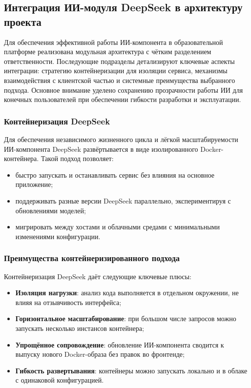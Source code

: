 \subsection{Интеграция ИИ-модуля DeepSeek в архитектуру проекта}

Для обеспечения эффективной работы ИИ-компонента в образовательной платформе реализована модульная архитектура с чётким разделением ответственности. Последующие подразделы детализируют ключевые аспекты интеграции: стратегию контейнеризации для изоляции сервиса, механизмы взаимодействия с клиентской частью и системные преимущества выбранного подхода. Основное внимание уделено сохранению прозрачности работы ИИ для конечных пользователей при обеспечении гибкости разработки и эксплуатации.

\subsubsection{Контейнеризация DeepSeek}
Для обеспечения независимого жизненного цикла и лёгкой масштабируемости ИИ-компонента DeepSeek развёртывается в виде изолированного Docker-контейнера. Такой подход позволяет:

\begin{itemize}
  \item быстро запускать и останавливать сервис без влияния на основное приложение;
  \item поддерживать разные версии DeepSeek параллельно, экспериментируя с обновлениями моделей;
  \item мигрировать между хостами и облачными средами с минимальными изменениями конфигурации.
\end{itemize}

\subsubsection{Преимущества контейнеризированного подхода}
Контейнеризация DeepSeek даёт следующие ключевые плюсы:
\begin{itemize}
  \item \textbf{Изоляция нагрузки}: анализ кода выполняется в отдельном окружении, не влияя на отзывчивость интерфейса;
  \item \textbf{Горизонтальное масштабирование}: при большом числе запросов можно запускать несколько инстансов контейнера;
  \item \textbf{Упрощённое сопровождение}: обновление ИИ-компонента сводится к выпуску нового Docker-образа без правок во фронтенде;
  \item \textbf{Гибкость развертывания}: контейнеры можно запускать локально и в облаке с одинаковой конфигурацией.
\end{itemize}

